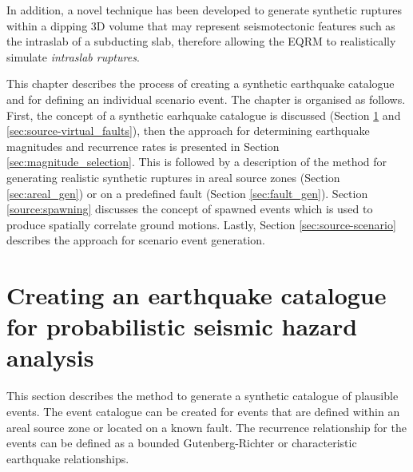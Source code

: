 In addition, a novel technique has been developed to generate synthetic ruptures within a dipping 3D volume that may represent seismotectonic 
features such as the intraslab of a subducting slab, therefore allowing the EQRM to realistically simulate \emph{intraslab ruptures}.

This chapter describes the process of creating a synthetic earthquake catalogue and for defining an individual scenario event. 
The chapter is organised as follows. First, the concept of a synthetic earhquake catalogue is discussed (Section \ref{sec:source-EQcat} and \ref{sec:source-virtual_faults}), 
then the approach for 
determining earthquake magnitudes and recurrence rates is presented in Section \ref{sec:magnitude_selection}. This is followed by a
description of the method for generating realistic synthetic ruptures in areal source zones (Section \ref{sec:areal_gen}) or on a predefined fault (Section \ref{sec:fault_gen}). 
Section \ref{source:spawning} discusses the concept of spawned events which is used to produce spatially correlate ground motions. Lastly, Section \ref{sec:source-scenario} describes the approach for scenario event generation.

\section{Creating an earthquake catalogue for probabilistic seismic hazard analysis}%
\label{sec:source-EQcat}

This section describes the method to generate a synthetic catalogue of plausible events. The event catalogue can be
created for events that are defined within an areal source zone or located on a known fault. The recurrence relationship for the events
can be defined as a bounded Gutenberg-Richter \citep{dr_Kramer96a} or characteristic earthquake \citep{eqrm_Schwartz84} relationships.

